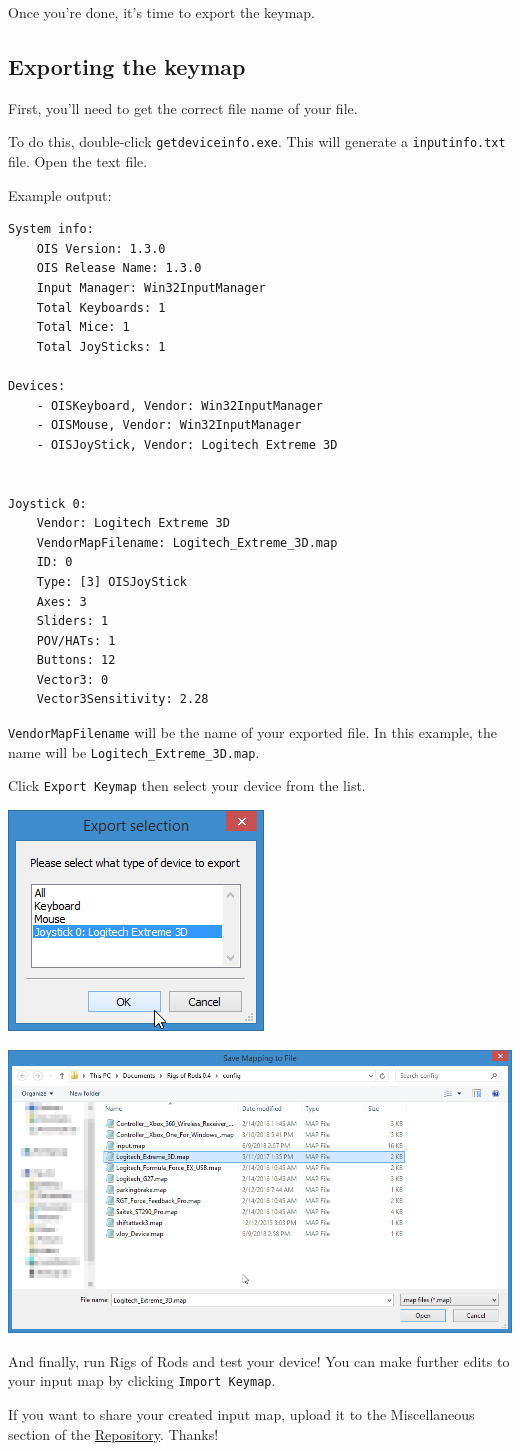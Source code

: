 Once you're done, it's time to export the keymap.

\hypertarget{exporting-the-keymap}{%
\subsection{Exporting the keymap}\label{exporting-the-keymap}}

First, you'll need to get the correct file name of your file.

To do this, double-click \texttt{getdeviceinfo.exe}. This will generate
a \texttt{inputinfo.txt} file. Open the text file.

Example output:

\begin{verbatim}
System info:
    OIS Version: 1.3.0
    OIS Release Name: 1.3.0
    Input Manager: Win32InputManager
    Total Keyboards: 1
    Total Mice: 1
    Total JoySticks: 1

Devices:
    - OISKeyboard, Vendor: Win32InputManager
    - OISMouse, Vendor: Win32InputManager
    - OISJoyStick, Vendor: Logitech Extreme 3D


Joystick 0:
    Vendor: Logitech Extreme 3D
    VendorMapFilename: Logitech_Extreme_3D.map
    ID: 0
    Type: [3] OISJoyStick
    Axes: 3
    Sliders: 1
    POV/HATs: 1
    Buttons: 12
    Vector3: 0
    Vector3Sensitivity: 2.28
\end{verbatim}

\texttt{VendorMapFilename} will be the name of your exported file. In
this example, the name will be \texttt{Logitech\_Extreme\_3D.map}.

Click \texttt{Export\ Keymap} then select your device from the list.

\includegraphics{images/InputMappingTool-5.png}

\includegraphics{images/InputMappingTool-6.png}

And finally, run Rigs of Rods and test your device! You can make further
edits to your input map by clicking \texttt{Import\ Keymap}.

If you want to share your created input map, upload it to the
Miscellaneous section of the
\href{https://forum.rigsofrods.org/resources/}{Repository}. Thanks!

